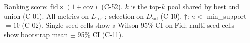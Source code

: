 Ranking score: $\mathrm{fid}\times(1+\mathrm{cov})$ (C-52). $k$ is the top-$k$ pool shared by best and union (C-01). All metrics on $D_{\mathrm{test}}$; selection on $D_{\mathrm{val}}$ (C-10). $\dagger$: $n < $ min\_support$=10$ (C-02). Single-seed cells show a Wilson 95\% CI on Fid; multi-seed cells show bootstrap mean $\pm$ 95\% CI (C-11).
